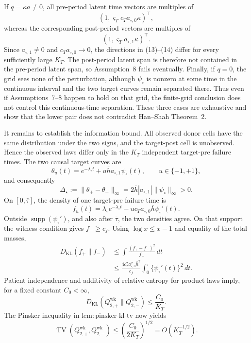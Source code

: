 If \(q=\kappa a\ne0\), all pre-period latent time vectors are multiples of
\[
 (1,\varsigma_Tc_Ta_{\circ,0}\kappa)^\top,
 \tag{13}
\]
whereas the corresponding post-period vectors are multiples of
\[
 (1,\varsigma_Ta_{\circ,1}\kappa)^\top.
 \tag{14}
\]
Since \(a_{\circ,1}\ne0\) and \(c_Ta_{\circ,0}\to0\), the directions in (13)--(14) differ for every sufficiently large \(K_T\).  The post-period latent span is therefore not contained in the pre-period latent span, so Assumption~8 fails eventually.  Finally, if \(q=0\), the grid sees none of the perturbation, although \(\psi_\circ\) is nonzero at some time in the continuous interval and the two target curves remain separated there.  Thus even if Assumptions~7--8 happen to hold on that grid, the finite-grid conclusion does not control this continuous-time separation.  These three cases are exhaustive and show that the lower pair does not contradict Han--Shah Theorem~2.

It remains to establish the information bound.  All observed donor cells have the same distribution under the two signs, and the target-post cell is unobserved.  Hence the observed laws differ only in the \(K_T\) independent target-pre failure times.  The two causal target curves are
\[
 \theta_u(t)=e^{-\lambda_\circ t}+u\bar h a_{\circ,1}\psi_\circ(t),
 \qquad u\in\{-1,+1\},
\]
and consequently
\[
 \Delta_\star:=\|\theta_+-\theta_-\|_\infty
 =2\bar h|a_{\circ,1}|\|\psi_\circ\|_\infty>0.
 \tag{15}
\]
On \([0,\bar\tau]\), the density of one target-pre failure time is
\[
 f_u(t)=\lambda_\circ e^{-\lambda_\circ t}
        -u c_Ta_{\circ,0}\bar h\psi_\circ'(t).
 \tag{16}
\]
Outside \(\operatorname{supp}(\psi_\circ')\), and also after \(\bar\tau\), the two densities agree.  On that support the witness condition gives \(f_-\ge c_f\).  Using \(\log x\le x-1\) and equality of the total masses,
\[
\begin{aligned}
 D_{\mathrm{KL}}(f_+\|f_-)
 &\le \int\frac{(f_+-f_-)^2}{f_-}\,dt \\
 &\le
 \frac{4c_T^2a_{\circ,0}^2\bar h^2}{c_f}
 \int_0^{\bar\tau}\{\psi_\circ'(t)\}^2\,dt.
\end{aligned}
\tag{17}
\]
Patient independence and additivity of relative entropy for product laws imply, for a fixed constant \(C_0<\infty\),
\[
 D_{\mathrm{KL}}(Q_{2,+}^{\mathrm{wk}}\|Q_{2,-}^{\mathrm{wk}})
 \le \frac{C_0}{K_T}.
 \tag{18}
\]
The Pinsker inequality in \(\mathrm{lem:pinsker\mbox{-}kl\mbox{-}tv}\) now yields
\[
 \operatorname{TV}(Q_{2,+}^{\mathrm{wk}},Q_{2,-}^{\mathrm{wk}})
 \le\left(\frac{C_0}{2K_T}\right)^{1/2}
 =O(K_T^{-1/2}).
 \tag{19}
\]

